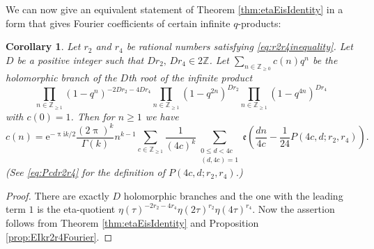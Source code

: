 \documentclass[12pt]{amsart}
\numberwithin{equation}{section}
\theoremstyle{plain}
\newtheorem{coro}[thm]{Corollary}
\theoremstyle{definition}
\theoremstyle{remark}
\newcommand\twoscript[2]{\substack{{#1} \\ {#2}}}
\newcommand\rmi{\mathrm{i}}
\newcommand\rme{\mathrm{e}}
\newcommand\etp[1]{\mathfrak{e}\left(#1\right)}
\newcommand\numZ{\mathbb{Z}}
\newcommand\numgeq[2]{\mathbb{#1}_{\geq #2}}
\begin{document}
We can now give an equivalent statement of Theorem \ref{thm:etaEisIdentity} in a form that gives Fourier coefficients of certain infinite $q$-products:
\begin{coro}
\label{coro:etaQuotientCoefficient}
Let $r_2$ and $r_4$ be rational numbers satisfying \eqref{eq:r2r4inequality}. Let $D$ be a positive integer such that $Dr_2,\,Dr_4\in2\numZ$. Let $\sum_{n\in\numgeq{Z}{0}}c(n)q^n$ be the holomorphic branch of the $D$th root of the infinite product
\begin{equation*}
\prod_{n\in\numgeq{Z}{1}}(1-q^n)^{-2Dr_2-4Dr_4}\prod_{n\in\numgeq{Z}{1}}(1-q^{2n})^{Dr_2}\prod_{n\in\numgeq{Z}{1}}(1-q^{4n})^{Dr_4}
\end{equation*}
with $c(0)=1$. Then for $n\geq 1$ we have
\begin{equation*}
c(n)=\rme^{-\uppi\rmi k/2}\frac{(2\uppi)^k}{\Gamma(k)}n^{k-1}\sum_{c\in\numgeq{Z}{1}}\frac{1}{(4c)^k}\sum_{\twoscript{0\leq d<4c}{(d,4c)=1}}\etp{\frac{dn}{4c}-\frac{1}{24}P(4c,d;r_2,r_4)}.
\end{equation*}
(See \eqref{eq:Pcdr2r4} for the definition of $P(4c,d;r_2,r_4)$.)
\end{coro}
\begin{proof}
There are exactly $D$ holomorphic branches and the one with the leading term $1$ is the eta-quotient $\eta(\tau)^{-2r_2-4r_4}\eta(2\tau)^{r_2}\eta(4\tau)^{r_4}$. Now the assertion follows from Theorem \ref{thm:etaEisIdentity} and Proposition \ref{prop:EIkr2r4Fourier}.
\end{proof}
\end{document}
